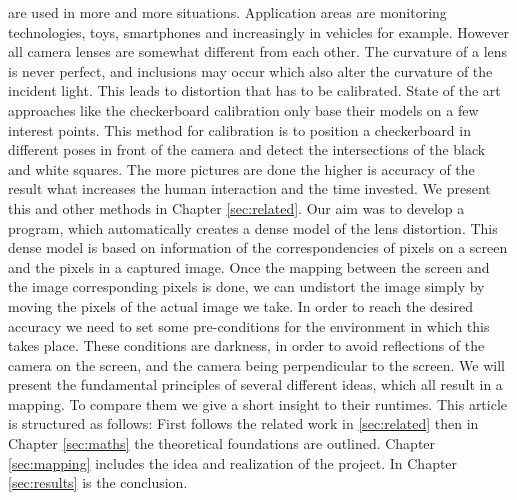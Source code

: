 \documentclass[journal,final,a4paper,twoside]{PS}
\begin{document}
 are used in more and more situations. Application areas are monitoring technologies, toys, smartphones and increasingly in vehicles for example. However all camera lenses are somewhat different from each other. The curvature of a lens is never perfect, and inclusions may occur which also alter the curvature of the incident light. This leads to distortion that has to be calibrated. State of the art approaches like the checkerboard calibration only base their models on a few interest points. This method for calibration is to position a checkerboard in different poses in front of the camera and detect the intersections of the black and white squares. The more pictures are done the higher is accuracy of the result what increases the human interaction and the time invested. We present this and other methods in Chapter \ref{sec:related}. 
Our aim was to develop a program, which automatically creates a dense model of the lens distortion. This dense model is based on information of the correspondencies of pixels on a screen and the pixels in a captured image. Once the mapping between the screen and the image corresponding pixels is done, we can undistort the image simply by moving the pixels of the actual image we take. In order to reach the desired accuracy we need to set some pre-conditions for the environment in which this takes place. These conditions are darkness, in order to avoid reflections of the camera on the screen, and the camera being perpendicular to the screen. We will present the fundamental principles of several different ideas, which all result in a mapping. To compare them we give a short insight to their runtimes. This article is structured as follows: First follows the related work in \ref{sec:related} then in Chapter \ref{sec:maths} the theoretical  foundations are outlined. Chapter \ref{sec:mapping} includes the idea and realization of the project. In Chapter \ref{sec:results} is the conclusion.
\end{document}
